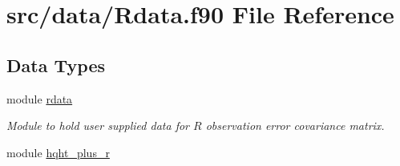 \hypertarget{_rdata_8f90}{\section{src/data/\-Rdata.f90 File Reference}
\label{_rdata_8f90}
}
\subsection*{Data Types}
\begin{DoxyCompactItemize}
\item 
module \hyperlink{classrdata}{rdata}
\begin{DoxyCompactList}\small\item\em Module to hold user supplied data for $R$ observation error covariance matrix. \end{DoxyCompactList}\item 
module \hyperlink{classhqht__plus__r}{hqht\-\_\-plus\-\_\-r}
\end{DoxyCompactItemize}
